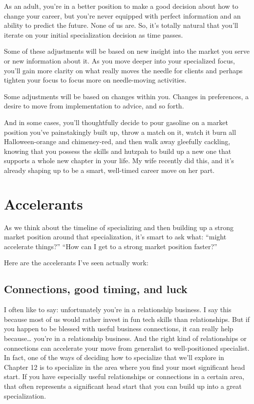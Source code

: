 As an adult, you're in a better position to make a good decision about how to change your career, but you're never equipped with perfect information and an ability to predict the future. None of us are. So, it's totally natural that you'll iterate on your initial specialization decision as time passes.

Some of these adjustments will be based on new insight into the market you serve or new information about it. As you move deeper into your specialized focus, you'll gain more clarity on what really moves the needle for clients and perhaps tighten your focus to focus more on needle-moving activities.

Some adjustments will be based on changes within you. Changes in preferences, a desire to move from implementation to advice, and so forth.

And in some cases, you'll thoughtfully decide to pour gasoline on a market position you've painstakingly built up, throw a match on it, watch it burn all Halloween-orange and chimeney-red, and then walk away gleefully cackling, knowing that you possess the skills and hutzpah to build up a new one that supports a whole new chapter in your life. My wife recently did this, and it's already shaping up to be a smart, well-timed career move on her part.

\section{Accelerants}

As we think about the timeline of specializing and then building up a strong market position around that specialization, it's smart to ask what: ``might accelerate things?'' ``How can I get to a strong market position faster?''

Here are the accelerants I've seen actually work:

\subsection{Connections, good timing, and luck}

I often like to say: unfortunately you’re in a relationship business. I say this because most of us would rather invest in fun tech skills than relationships. But if you happen to be blessed with useful business connections, it can really help because… you’re in a relationship business. And the right kind of relationships or connections can accelerate your move from generalist to well-positioned specialist. In fact, one of the ways of deciding how to specialize that we’ll explore in Chapter 12 is to specialize in the area where you find your most significant head start. If you have especially useful relationships or connections in a certain area, that often represents a significant head start that you can build up into a great specialization.

